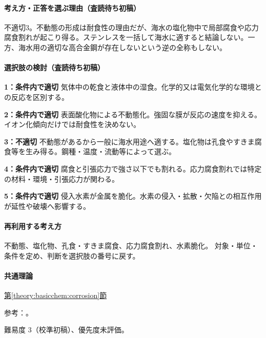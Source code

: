 \paragraph{考え方・正答を選ぶ理由（査読待ち初稿）} 不適切3。不動態の形成は耐食性の理由だが、海水の塩化物中で局部腐食や応力腐食割れが起こり得る。ステンレスを一括して海水に適すると結論しない。一方、海水用の適切な高合金鋼が存在しないという逆の全称もしない。

\paragraph{選択肢の検討（査読待ち初稿）}\mbox{}\par

\noindent\textbf{1：条件内で適切} 気体中の乾食と液体中の湿食。化学的又は電気化学的な環境との反応を区別する。\par

\noindent\textbf{2：条件内で適切} 表面酸化物による不動態化。強固な膜が反応の速度を抑える。イオン化傾向だけでは耐食性を決めない。\par

\noindent\textbf{3：不適切} 不動態があるから一般に海水用途へ適する。塩化物は孔食やすきま腐食等を生み得る。鋼種・温度・流動等によって選ぶ。\par

\noindent\textbf{4：条件内で適切} 腐食と引張応力で強さ以下でも割れる。応力腐食割れでは特定の材料・環境・引張応力が関わる。\par

\noindent\textbf{5：条件内で適切} 侵入水素が金属を脆化。水素の侵入・拡散・欠陥との相互作用が延性や破壊へ影響する。\par

\paragraph{再利用する考え方} 不動態、塩化物、孔食・すきま腐食、応力腐食割れ、水素脆化。 対象・単位・条件を定め、判断を選択肢の番号に戻す。

\paragraph{共通理論} \hyperref[theory:basicchem:corrosion]{第\ref*{theory:basicchem:corrosion}節}

\par 参考：\cite{chem55_corrosion,nims_hydrogen2024}。

\par 難易度 3（校準初稿）、優先度未評価。

